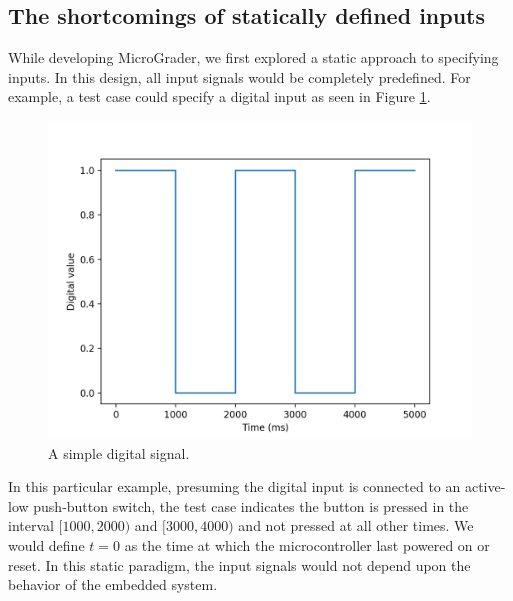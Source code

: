 \documentclass[12pt]{article}
\begin{document}
\subsection{The shortcomings of statically defined inputs}
While developing MicroGrader, we first explored a static approach to specifying inputs.  In this design, all input signals would be completely predefined.  For example, a test case could specify a digital input as seen in Figure \ref{fig:static-input}.

\begin{figure}[ht]
\centering
\includegraphics[scale=0.75]{button-signal.png}
\vspace{5mm}
\caption{A simple digital signal.}
\label{fig:static-input}
\end{figure}

In this particular example, presuming the digital input is connected to an active-low push-button switch, the test case indicates the button is pressed in the interval $[1000,2000)$ and $[3000,4000)$ and not pressed at all other times.  We would define $t=0$ as the time at which the microcontroller last powered on or reset.  In this static paradigm, the input signals would not depend upon the behavior of the embedded system.
\end{document}
